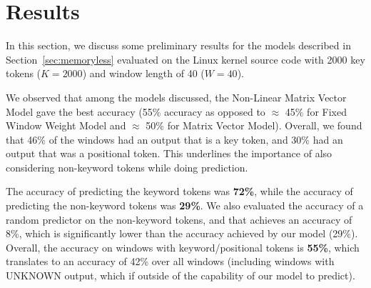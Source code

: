 \section{Results}
\label{sec:results}
In this section, we discuss some preliminary results for the models described in
Section~\ref{sec:memoryless} evaluated on the Linux kernel source code with
2000 key tokens ($K = 2000$) and window length of 40 ($W = 40$).

We observed that among the models discussed, the Non-Linear Matrix Vector Model
gave the best accuracy (55\% accuracy as opposed to $\approx$ 45\% for Fixed
Window Weight Model and $\approx$ 50\% for Matrix Vector Model). Overall, we
found that 46\% of the windows had an output that is a key token, and 30\% had
an output that was a positional token. This underlines the importance of also
considering non-keyword tokens while doing prediction.

The accuracy of predicting the keyword tokens was {\bf 72\%}, while the accuracy
of predicting the non-keyword tokens was {\bf 29\%}. We also evaluated the
accuracy of a random predictor on the non-keyword tokens, and that achieves an
accuracy of 8\%, which is significantly lower than the accuracy achieved by our
model (29\%). Overall, the accuracy on windows with keyword/positional tokens is
{\bf 55\%}, which translates to an accuracy of 42\% over all windows (including
windows with UNKNOWN output, which if outside of the capability of our model to
predict).

